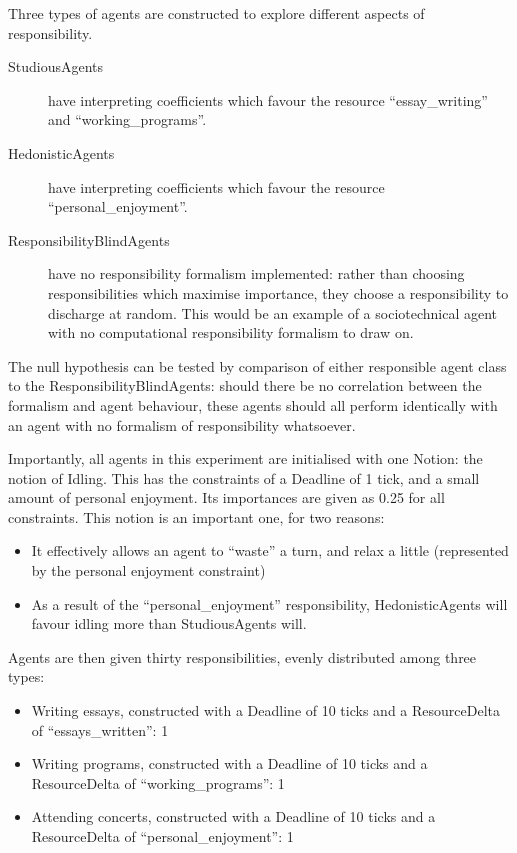 Three types of agents are constructed to explore different aspects of responsibility. 

\begin{description}
    \item [StudiousAgents ] have interpreting coefficients which favour the resource ``essay\_writing'' and ``working\_programs''.
    \item [HedonisticAgents ] have interpreting coefficients which favour the resource ``personal\_enjoyment''.
    \item [ResponsibilityBlindAgents ] have no responsibility formalism implemented: rather than choosing responsibilities which maximise importance, they choose a responsibility to discharge at random. This would be an example of a sociotechnical agent with no computational responsibility formalism to draw on.
\end{description}

The null hypothesis can be tested by comparison of either responsible agent class to the ResponsibilityBlindAgents: should there be no correlation between the formalism and agent behaviour, these agents should all perform identically with an agent with no formalism of responsibility whatsoever.\par

Importantly, all agents in this experiment are initialised with one Notion: the notion of Idling. This has the constraints of a Deadline of 1 tick, and a small amount of personal enjoyment. Its importances are given as 0.25 for all constraints. This notion is an important one, for two reasons:

\begin{itemize}
    \item It effectively allows an agent to ``waste'' a turn, and relax a little (represented by the personal enjoyment constraint)
    \item As a result of the ``personal\_enjoyment'' responsibility, HedonisticAgents will favour idling more than StudiousAgents will.
\end{itemize}

Agents are then given thirty responsibilities, evenly distributed among three types:

\begin{itemize}
    \item Writing essays, constructed with a Deadline of 10 ticks and a ResourceDelta of ``essays\_written'': 1
    \item Writing programs, constructed with a Deadline of 10 ticks and a ResourceDelta of ``working\_programs'': 1
    \item Attending concerts, constructed with a Deadline of 10 ticks and a ResourceDelta of ``personal\_enjoyment'': 1
\end{itemize}

